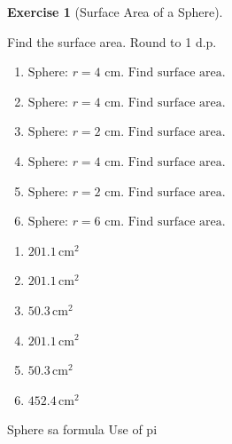\documentclass[
  letterpaper,
  DIV=11,
  numbers=noendperiod]{scrreprt}
\theoremstyle{definition}
\newtheorem{exercise}{Exercise}[chapter]
\theoremstyle{remark}
\begin{document}
\begin{exercise}[Surface Area of a
Sphere]\protect\hypertarget{exr-cur-11}{}\label{exr-cur-11}

Find the surface area. Round to 1 d.p.

\begin{enumerate}
\def\labelenumi{\alph{enumi})}
\item
  \(\text{Sphere: }r=4\text{ cm. Find surface area.}\)
\item
  \(\text{Sphere: }r=4\text{ cm. Find surface area.}\)
\item
  \(\text{Sphere: }r=2\text{ cm. Find surface area.}\)
\item
  \(\text{Sphere: }r=4\text{ cm. Find surface area.}\)
\item
  \(\text{Sphere: }r=2\text{ cm. Find surface area.}\)
\item
  \(\text{Sphere: }r=6\text{ cm. Find surface area.}\)
\end{enumerate}

\begin{tcolorbox}[enhanced jigsaw, opacitybacktitle=0.6, coltitle=black, arc=.35mm, colframe=quarto-callout-tip-color-frame, colback=white, bottomrule=.15mm, left=2mm, colbacktitle=quarto-callout-tip-color!10!white, titlerule=0mm, opacityback=0, title=\textcolor{quarto-callout-tip-color}{\faLightbulb}\hspace{0.5em}{🔍 View Solution}, leftrule=.75mm, breakable, rightrule=.15mm, bottomtitle=1mm, toptitle=1mm, toprule=.15mm]

\begin{enumerate}
\def\labelenumi{\alph{enumi})}
\item
  \(201.1\,\text{cm}^{2}\)
\item
  \(201.1\,\text{cm}^{2}\)
\item
  \(50.3\,\text{cm}^{2}\)
\item
  \(201.1\,\text{cm}^{2}\)
\item
  \(50.3\,\text{cm}^{2}\)
\item
  \(452.4\,\text{cm}^{2}\)
\end{enumerate}

\end{tcolorbox}

{Sphere sa formula} {Use of pi}

\end{exercise}
\end{document}
